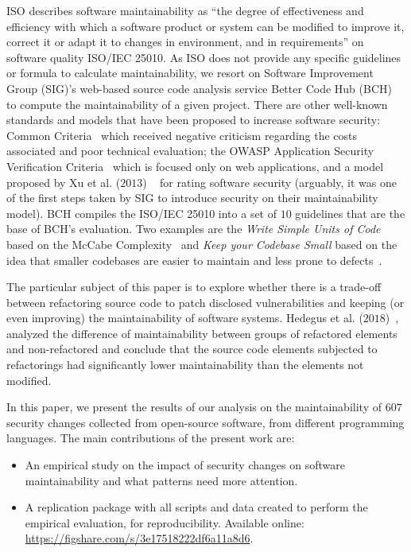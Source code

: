 \documentclass[10pt,conference]{IEEEtran}
\begin{document}
ISO describes software maintainability as ``the degree of effectiveness and
efficiency with which a software product or system can be modified to improve
it, correct it or adapt it to changes in environment, and in requirements'' on
software quality ISO/IEC 25010. As ISO does not provide any specific guidelines
or formula to calculate maintainability, we resort on Software Improvement
Group (SIG)'s web-based source code analysis service Better Code Hub
(BCH)~\cite{Visser:2016:OREILLY} to compute the maintainability of a given
project. There are other well-known standards and models that have been proposed
to increase software security: Common Criteria~\cite{common:2009} which received
negative criticism regarding the costs associated and poor technical evaluation;
the OWASP Application Security Verification Criteria~\cite{oswap:2009} which is
focused only on web applications, and a model proposed by Xu et al. ($2013$)
~\cite{6616351} for rating software security (arguably, it was one of the
first steps taken by SIG to introduce security on their maintainability model).
BCH compiles the ISO/IEC 25010 into a set of $10$ guidelines that are the
base of BCH's evaluation. Two examples are the \emph{Write Simple Units of Code}
based on the McCabe Complexity~\cite{1702388} and \emph{Keep your Codebase Small}
based on the idea that smaller codebases are easier to maintain and less prone to defects~\cite{Visser:2016:OREILLY}.

The particular subject of this paper is to explore whether there is a trade-off
between refactoring source code to patch disclosed vulnerabilities and keeping
(or even improving) the maintainability of software systems. Hedegus et al.
($2018$)~\cite{HEGEDUS2018313}, analyzed the difference of maintainability between
groups of refactored elements and non-refactored and conclude that the source
code elements subjected to refactorings had significantly lower maintainability
than the elements not modified.

In this paper, we present the results of our analysis on the maintainability of
$607$ security changes collected from open-source software, from different
programming languages. The main contributions of the present work are:

\begin{itemize}
	\item An empirical study on the impact of security changes on software
	maintainability and what patterns need more attention.
	\item A replication package with all scripts and data created to perform the
	empirical evaluation, for reproducibility. Available online:
  \url{https://figshare.com/s/3e17518222df6a11a8d6}.
\end{itemize}
\end{document}
